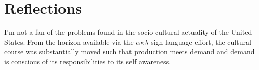 \documentclass[twocolumn,12pt]{article}
\begin{document}
\section{Reflections}

I'm not a fan of the problems found in the socio-cultural actuality of
the United States.  From the horizon available via the
$\alpha\kappa\lambda$ sign language effort, the cultural course was
substantially moved such that production meets demand and demand is
conscious of its responsibilities to its self awareness.



\end{document}

